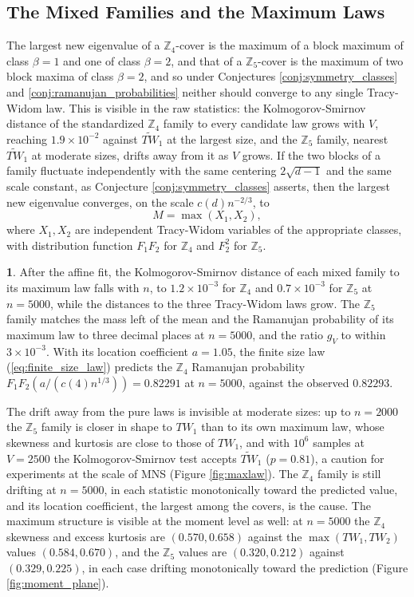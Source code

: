 \documentclass[12pt,oneside,english]{amsart}
\numberwithin{equation}{section}
\numberwithin{figure}{section}
\numberwithin{table}{section}
\theoremstyle{plain}
\numberwithin{thm}{section}
\theoremstyle{plain}
\theoremstyle{plain}
\theoremstyle{plain}
\theoremstyle{definition}
\theoremstyle{definition}
\newtheorem{numresult}[thm]{\protect\numresultname}
\theoremstyle{definition}
\theoremstyle{remark}
\providecommand{\numresultname}{Numerical Result}
\begin{document}
\subsection{\label{subsec:mixed}The Mixed Families and the Maximum Laws}

The largest new eigenvalue of a $\mathbb{Z}_{4}$-cover is the maximum
of a block maximum of class $\beta=1$ and one of class $\beta=2$,
and that of a $\mathbb{Z}_{5}$-cover is the maximum of two block maxima
of class $\beta=2$, and so under Conjectures \ref{conj:symmetry_classes}
and \ref{conj:ramanujan_probabilities} neither should converge to
any single Tracy-Widom law. This is visible in the raw statistics:
the Kolmogorov-Smirnov distance of the standardized $\mathbb{Z}_{4}$
family to every candidate law grows with $V$, reaching $1.9\times10^{-2}$
against $\widetilde{TW}_{1}$ at the largest size, and the $\mathbb{Z}_{5}$
family, nearest $\widetilde{TW}_{1}$ at moderate sizes, drifts away
from it as $V$ grows. If the two blocks of a family fluctuate independently
with the same centering $2\sqrt{d-1}$ and the same scale constant,
as Conjecture \ref{conj:symmetry_classes} asserts, then the largest
new eigenvalue converges, on the scale $c(d)n^{-2/3}$, to
\[
M=\max\left(X_{1},X_{2}\right),
\]
where $X_{1},X_{2}$ are independent Tracy-Widom variables of the
appropriate classes, with distribution function $F_{1}F_{2}$ for
$\mathbb{Z}_{4}$ and $F_{2}^{2}$ for $\mathbb{Z}_{5}$.
\begin{numresult}
\label{nr:max_laws}After the affine fit, the Kolmogorov-Smirnov distance
of each mixed family to its maximum law falls with $n$, to $1.2\times10^{-3}$
for $\mathbb{Z}_{4}$ and $0.7\times10^{-3}$ for $\mathbb{Z}_{5}$
at $n=5000$, while the distances to the three Tracy-Widom laws grow.
The $\mathbb{Z}_{5}$ family matches the mass left of the mean and
the Ramanujan probability of its maximum law to three decimal places
at $n=5000$, and the ratio $g_{V}$ to within $3\times10^{-3}$. With
its location coefficient $a=1.05$, the finite size law (\ref{eq:finite_size_law})
predicts the $\mathbb{Z}_{4}$ Ramanujan probability $F_{1}F_{2}(a/(c(4)n^{1/3}))=0.82291$
at $n=5000$, against the observed $0.82293$.
\end{numresult}
The drift away from the pure laws is invisible at moderate sizes: up
to $n=2000$ the $\mathbb{Z}_{5}$ family is closer in shape to $TW_{1}$
than to its own maximum law, whose skewness and kurtosis are close
to those of $TW_{1}$, and with $10^{6}$ samples at $V=2500$ the
Kolmogorov-Smirnov test accepts $\widetilde{TW}_{1}$ ($p=0.81$),
a caution for experiments at the scale of MNS (Figure \ref{fig:maxlaw}).
The $\mathbb{Z}_{4}$ family is still drifting at $n=5000$, in each
statistic monotonically toward the predicted value, and its location
coefficient, the largest among the covers, is the cause. The maximum
structure is visible at the moment level as well: at $n=5000$ the
$\mathbb{Z}_{4}$ skewness and excess kurtosis are $\left(0.570,0.658\right)$
against the $\max(TW_{1},TW_{2})$ values $\left(0.584,0.670\right)$,
and the $\mathbb{Z}_{5}$ values are $\left(0.320,0.212\right)$ against
$\left(0.329,0.225\right)$, in each case drifting monotonically toward
the prediction (Figure \ref{fig:moment_plane}).
\end{document}
